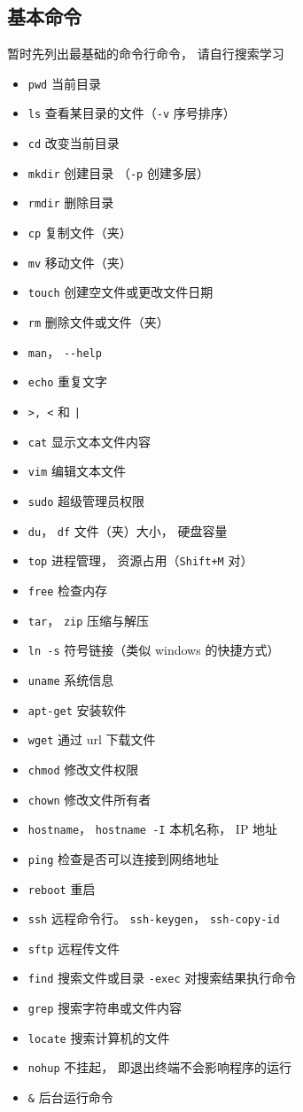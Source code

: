 \subsection{基本命令}
暂时先列出最基础的命令行命令， 请自行搜索学习
\begin{itemize}
\item \verb`pwd` 当前目录
\item \verb`ls` 查看某目录的文件（\verb`-v` 序号排序）
\item \verb`cd` 改变当前目录
\item \verb`mkdir` 创建目录 （\verb`-p` 创建多层）
\item \verb`rmdir` 删除目录
\item \verb`cp` 复制文件（夹）
\item \verb`mv` 移动文件（夹）
\item \verb`touch` 创建空文件或更改文件日期
\item \verb`rm` 删除文件或文件（夹）
\item \verb`man`， \verb`--help`
\item \verb`echo` 重复文字
\item \verb`>, <` 和 \verb`|`
\item \verb`cat` 显示文本文件内容
\item \verb`vim` 编辑文本文件
\item \verb`sudo` 超级管理员权限
\item \verb`du`， \verb`df` 文件（夹）大小， 硬盘容量
\item \verb`top` 进程管理， 资源占用（\verb`Shift+M` 对）
\item \verb`free` 检查内存
\item \verb`tar`， \verb`zip` 压缩与解压
\item \verb`ln -s` 符号链接（类似 windows 的快捷方式）
\item \verb`uname` 系统信息
\item \verb`apt-get` 安装软件
\item \verb`wget` 通过 url 下载文件
\item \verb`chmod` 修改文件权限
\item \verb`chown` 修改文件所有者
\item \verb`hostname`， \verb`hostname -I` 本机名称， IP 地址
\item \verb`ping` 检查是否可以连接到网络地址
\item \verb`reboot` 重启
\item \verb`ssh` 远程命令行。 \verb`ssh-keygen`， \verb`ssh-copy-id`
\item \verb`sftp` 远程传文件
\item \verb`find` 搜索文件或目录 \verb`-exec` 对搜索结果执行命令
\item \verb`grep` 搜索字符串或文件内容
\item \verb`locate` 搜索计算机的文件
\item \verb`nohup` 不挂起， 即退出终端不会影响程序的运行
\item \verb`&` 后台运行命令
\end{itemize}

